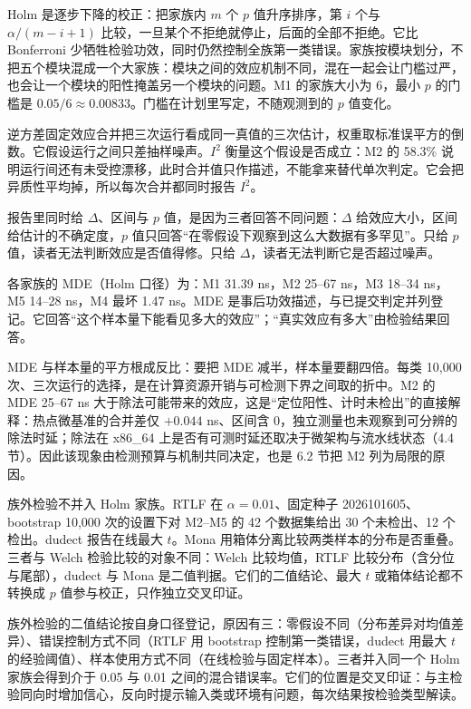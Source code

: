 Holm 是逐步下降的校正：把家族内 $m$ 个 $p$ 值升序排序，第 $i$ 个与 $\alpha/(m-i+1)$ 比较，一旦某个不拒绝就停止，后面的全部不拒绝。它比 Bonferroni 少牺牲检验功效，同时仍然控制全族第一类错误。家族按模块划分，不把五个模块混成一个大家族：模块之间的效应机制不同，混在一起会让门槛过严，也会让一个模块的阳性掩盖另一个模块的问题。M1 的家族大小为 6，最小 $p$ 的门槛是 $0.05/6\approx0.00833$。门槛在计划里写定，不随观测到的 $p$ 值变化。

逆方差固定效应合并把三次运行看成同一真值的三次估计，权重取标准误平方的倒数。它假设运行之间只差抽样噪声。$I^2$ 衡量这个假设是否成立：M2 的 58.3\% 说明运行间还有未受控漂移，此时合并值只作描述，不能拿来替代单次判定。它会把异质性平均掉，所以每次合并都同时报告 $I^2$。

报告里同时给 $\Delta$、区间与 $p$ 值，是因为三者回答不同问题：$\Delta$ 给效应大小，区间给估计的不确定度，$p$ 值只回答“在零假设下观察到这么大数据有多罕见”。只给 $p$ 值，读者无法判断效应是否值得修。只给 $\Delta$，读者无法判断它是否超过噪声。

各家族的 MDE（Holm 口径）为：M1 31.39 ns，M2 25--67 ns，M3 18--34 ns，M5 14--28 ns，M4 最坏 1.47 ns。MDE 是事后功效描述，与已提交判定并列登记。它回答“这个样本量下能看见多大的效应”；“真实效应有多大”由检验结果回答。 %

MDE 与样本量的平方根成反比：要把 MDE 减半，样本量要翻四倍。每类 10,000 次、三次运行的选择，是在计算资源开销与可检测下界之间取的折中。M2 的 MDE 25--67 ns 大于除法可能带来的效应，这是“定位阳性、计时未检出”的直接解释：热点微基准的合并差仅 $+0.044$ ns、区间含 0，独立测量也未观察到可分辨的除法时延；除法在 x86\_64 上是否有可测时延还取决于微架构与流水线状态（4.4 节）。因此该现象由检测预算与机制共同决定，也是 6.2 节把 M2 列为局限的原因。

族外检验不并入 Holm 家族。RTLF 在 $\alpha=0.01$、固定种子 2026101605、bootstrap 10,000 次的设置下对 M2--M5 的 42 个数据集给出 30 个未检出、12 个检出\cite{rtlf}。dudect 报告在线最大 $t$\cite{dudect}。Mona 用箱体分离比较两类样本的分布是否重叠。三者与 Welch 检验比较的对象不同：Welch 比较均值，RTLF 比较分布（含分位与尾部），dudect 与 Mona 是二值判据。它们的二值结论、最大 $t$ 或箱体结论都不转换成 $p$ 值参与校正，只作独立交叉印证。 %

族外检验的二值结论按自身口径登记，原因有三：零假设不同（分布差异对均值差异）、错误控制方式不同（RTLF 用 bootstrap 控制第一类错误，dudect 用最大 $t$ 的经验阈值）、样本使用方式不同（在线检验与固定样本）。三者并入同一个 Holm 家族会得到介于 0.05 与 0.01 之间的混合错误率。它们的位置是交叉印证：与主检验同向时增加信心，反向时提示输入类或环境有问题，每次结果按检验类型解读。

